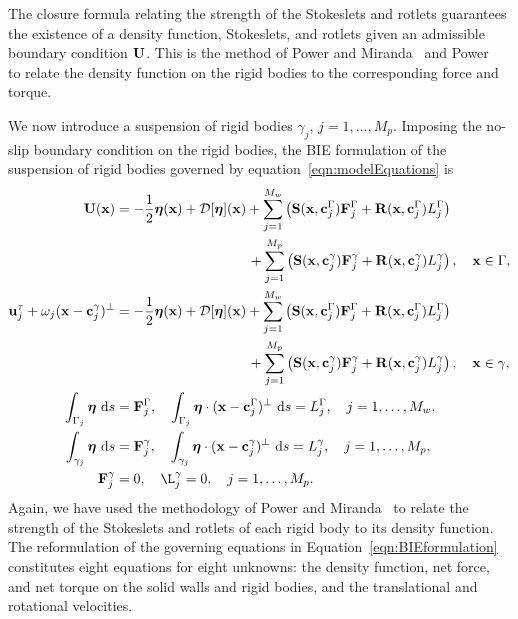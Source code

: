 \documentclass[preprint, 10pt]{elsarticle}
\begin{document}
The closure formula relating the strength of the Stokeslets and rotlets
guarantees the existence of a density function, Stokeslets, and rotlets
given an admissible boundary condition ${\mathbf{U}}$.  This is the method of
Power and Miranda~\cite{pow-mir1987} and Power~\cite{Power1993} to
relate the density function on the rigid bodies to the corresponding
force and torque.

We now introduce a suspension of rigid bodies $\gamma_j$,
$j=1,\ldots,M_p$.  Imposing the no-slip boundary condition on the rigid
bodies, the BIE formulation of the suspension of rigid bodies governed
by equation~\eqref{eqn:modelEquations} is
\begin{subequations}
  \label{eqn:BIEformulation}
  \begin{align}
    \UU(\xx) &= -\frac{1}{2}\eeta(\xx) + \DD[\eeta](\xx) +
    \sum_{j=1}^{M_w} \left(\mathbf{S}(\xx,\cc^\Gamma_j)\FF^\Gamma_j + 
      \mathbf{R}(\xx,\cc^\Gamma_j)L^\Gamma_j\right)  \nonumber \\
      &\hspace{96pt}+\sum_{j=1}^{M_p} \left(\mathbf{S}(\xx,\cc^\gamma_j)\FF^\gamma_j + 
      \mathbf{R}(\xx,\cc^\gamma_j)L^\gamma_j\right), 
    \quad \xx \in \Gamma, \label{eqn:BIEformulation1} \\
  \uu^\tau_j + \omega_j(\xx - \cc_j^\gamma)^\perp &=
    -\frac{1}{2}\eeta(\xx) + \DD[\eeta](\xx) + 
    \sum_{j=1}^{M_w} \left(\mathbf{S}(\xx,\cc^\Gamma_j)\FF^\Gamma_j + 
      \mathbf{R}(\xx,\cc^\Gamma_j)L^\Gamma_j\right) \nonumber \\
    &\hspace{96pt}+\sum_{j=1}^{M_p} \left(\mathbf{S}(\xx,\cc^\gamma_j)\FF^\gamma_j + 
      \mathbf{R}(\xx,\cc^\gamma_j)L^\gamma_j\right), 
    \quad \xx \in \gamma, \label{eqn:BIEformulation2} \\
  \int_{\Gamma_j} \eeta~\text{d}s &= \FF^\Gamma_j, \quad
  \int_{\Gamma_j} \eeta\cdot (\xx - \cc^\Gamma_j)^\perp~\text{d}s =
  L^\Gamma_j, \quad j=1,\ldots,M_w, \label{eqn:BIEformulation3} \\
  \int_{\gamma_j} \eeta~\text{d}s &= \FF^\gamma_j, \quad
  \int_{\gamma_j} \eeta\cdot (\xx - \cc^\gamma_j)^\perp~\text{d}s =
  L^\gamma_j,\quad j=1,\ldots,M_p, \label{eqn:BIEformulation4} \\
  \FF^\gamma_j &= 0, \quad \L^\gamma_j = 0,\quad j=1,\ldots,M_p.
  \label{eqn:BIEformulation5}
\end{align}
\end{subequations}
Again, we have used the methodology of Power and
Miranda~\cite{Power1987, Power1993} to relate the strength of the Stokeslets and
rotlets of each rigid body to its density function.  The reformulation
of the governing equations in Equation~\eqref{eqn:BIEformulation}
constitutes eight equations for eight unknowns: the density function,
net force, and net torque on the solid walls and rigid bodies, and the
translational and rotational velocities.  
\end{document}
